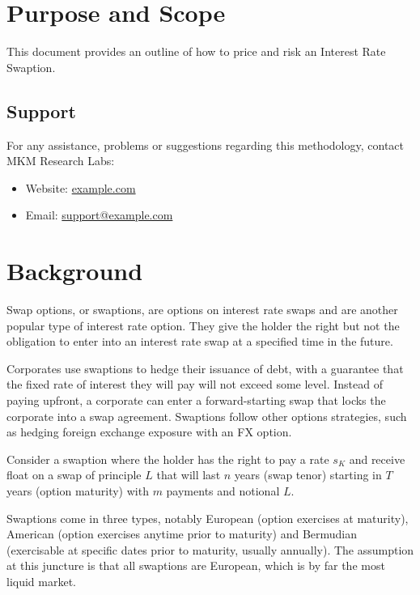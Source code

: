 \documentclass[11pt]{article}
\begin{document}
\tableofcontents
\clearpage

\section{Purpose and Scope}
This document provides an outline of how to price and risk an Interest Rate Swaption. \par

\subsection{Support}
For any assistance, problems or suggestions regarding this methodology, contact MKM Research Labs:
\begin{itemize}
  \item Website: \href{https://example.com}{example.com}
  \item Email: \href{mailto:support@example.com}{support@example.com}
\end{itemize}

\section{Background}

Swap options, or swaptions, are options on interest rate swaps and are another popular type of interest rate option. They give the holder the right but not the obligation to enter into an interest rate swap at a specified time in the future. \par

Corporates use swaptions to hedge their issuance of debt, with a guarantee that the fixed rate of interest they will pay will not exceed some level. Instead of paying upfront, a corporate can enter a forward-starting swap that locks the corporate into a swap agreement. Swaptions follow other options strategies, such as hedging foreign exchange exposure with an FX option. \par

Consider a swaption where the holder has the right to pay a rate $s_K$ and receive float on a swap of principle $L$ that will last $n$ years (swap tenor) starting in $T$ years (option maturity) with $m$ payments and notional $L$. \par

Swaptions come in three types, notably European (option exercises at maturity), American (option exercises anytime prior to maturity) and Bermudian (exercisable at specific dates prior to maturity, usually annually).  The assumption at this juncture is that all swaptions are European, which is by far the most liquid market. \par
\end{document}
